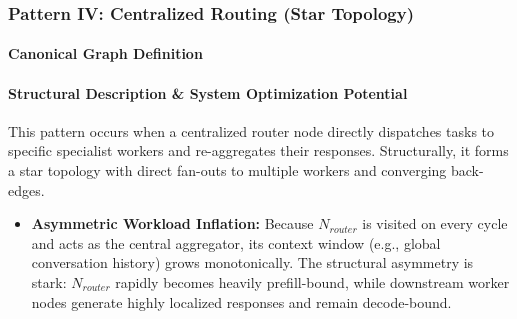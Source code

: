 \subsubsection{Pattern IV: Centralized Routing (Star Topology)}

\paragraph{Canonical Graph Definition}
\begin{center}
\end{center}

\paragraph{Structural Description \& System Optimization Potential}
This pattern occurs when a centralized router node directly dispatches tasks to specific specialist workers and re-aggregates their responses. Structurally, it forms a star topology with direct fan-outs to multiple workers and converging back-edges.
\begin{itemize}
    \item \textbf{Asymmetric Workload Inflation:} Because $N_{router}$ is visited on every cycle and acts as the central aggregator, its context window (e.g., global conversation history) grows monotonically. The structural asymmetry is stark: $N_{router}$ rapidly becomes heavily prefill-bound, while downstream worker nodes generate highly localized responses and remain decode-bound.
\end{itemize}

